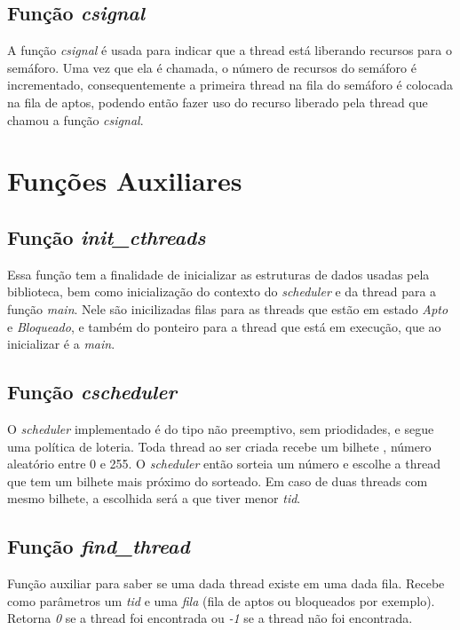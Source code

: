 \documentclass{article}
\begin{document}
\subsection{Função \textit{csignal}}
A função \textit{csignal} é usada para indicar que a thread está liberando recursos para o semáforo. Uma vez que ela é chamada, o número de recursos do semáforo é incrementado, consequentemente a primeira thread na fila do semáforo é colocada na fila de aptos, podendo então fazer uso do recurso liberado pela thread que chamou a função \textit{csignal}.

\section{Funções Auxiliares}

\subsection{Função \textit{init\_cthreads}}
Essa função tem a finalidade de inicializar as estruturas de dados usadas pela biblioteca, bem como inicialização do contexto do \textit{scheduler} e da thread para a função \textit{main}. Nele são inicilizadas filas para as threads que estão em estado \textit{Apto} e \textit{Bloqueado}, e também do ponteiro para a thread que está em execução, que ao inicializar é a \textit{main}.

\subsection{Função \textit{cscheduler}}
O \textit{scheduler} implementado é do tipo não preemptivo, sem priodidades, e segue uma política de loteria. Toda thread ao ser criada recebe um bilhete \footnotemark, número aleatório entre 0 e 255. O \textit{scheduler} então sorteia um número e escolhe a thread que tem um bilhete mais próximo do sorteado. Em caso de duas threads com mesmo bilhete, a escolhida será a  que tiver menor \textit{tid}.

\subsection{Função \textit{find\_thread}}
Função auxiliar para saber se uma dada thread existe em uma dada fila. Recebe como parâmetros um \textit{tid} e uma \textit{fila} (fila de aptos ou bloqueados por exemplo). Retorna \textit{0} se a thread foi encontrada ou \textit{-1} se a thread não foi encontrada.
\end{document}
